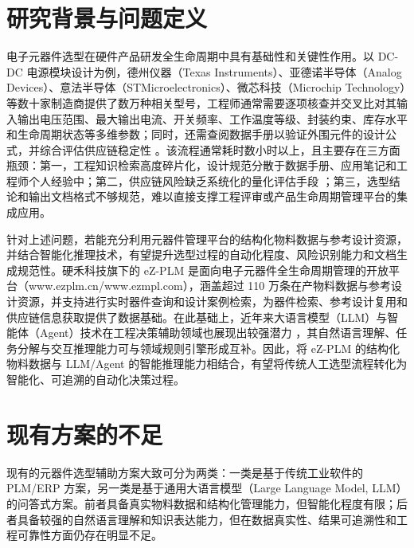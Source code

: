 
\section{研究背景与问题定义}
电子元器件选型在硬件产品研发全生命周期中具有基础性和关键性作用。以 DC-DC 电源模块设计为例，德州仪器（Texas Instruments）、亚德诺半导体（Analog Devices）、意法半导体（STMicroelectronics）、微芯科技（Microchip Technology）等数十家制造商提供了数万种相关型号，工程师通常需要逐项核查并交叉比对其输入输出电压范围、最大输出电流、开关频率、工作温度等级、封装约束、库存水平和生命周期状态等多维参数；同时，还需查阅数据手册以验证外围元件的设计公式，并综合评估供应链稳定性 \cite{pecht2008parts}。该流程通常耗时数小时以上，且主要存在三方面瓶颈：第一，工程知识检索高度碎片化，设计规范分散于数据手册、应用笔记和工程师个人经验中；第二，供应链风险缺乏系统化的量化评估手段 \cite{chen2021supplyrisk}；第三，选型结论和输出文档格式不够规范，难以直接支撑工程评审或产品生命周期管理平台的集成应用。

针对上述问题，若能充分利用元器件管理平台的结构化物料数据与参考设计资源，并结合智能化推理技术，有望提升选型过程的自动化程度、风险识别能力和文档生成规范性。硬禾科技旗下的 eZ-PLM 是面向电子元器件全生命周期管理的开放平台（www.ezplm.cn/www.ezmpl.com），涵盖超过 110 万条在产物料数据与参考设计资源，并支持进行实时器件查询和设计案例检索，为器件检索、参考设计复用和供应链信息获取提供了数据基础。在此基础上，近年来大语言模型（LLM）与智能体（Agent）技术在工程决策辅助领域也展现出较强潜力 \cite{xi2023rise,li2023llmagent}，其自然语言理解、任务分解与交互推理能力可与领域规则引擎形成互补。因此，将 eZ-PLM 的结构化物料数据与 LLM/Agent 的智能推理能力相结合，有望将传统人工选型流程转化为智能化、可追溯的自动化决策过程。

\section{现有方案的不足}

现有的元器件选型辅助方案大致可分为两类：一类是基于传统工业软件的 PLM/ERP 方案，另一类是基于通用大语言模型（Large Language Model, LLM）的问答式方案。前者具备真实物料数据和结构化管理能力，但智能化程度有限；后者具备较强的自然语言理解和知识表达能力，但在数据真实性、结果可追溯性和工程可靠性方面仍存在明显不足。

